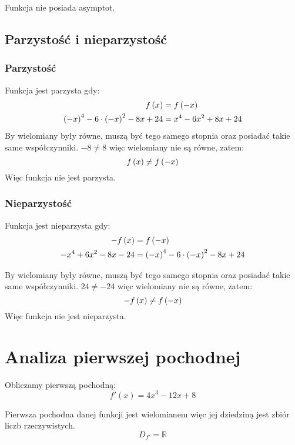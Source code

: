 \documentclass[a4paper,12pt]{article}
\newcommand{\fodx}{
		\ensuremath f \left( x \right)
	}
\newcommand{\naw}[1]{
		\ensuremath \left( #1 \right)
	}
\begin{document}
Funkcja nie posiada asymptot. 

\subsection{Parzystość i nieparzystość}
\subsubsection*{Parzystość}
Funkcja jest parzysta gdy:
\begin{align*}
	\fodx &= f \left( -x \right) \\
	\naw{-x}^4 - 6 \cdot \naw{-x}^2 - 8x +24 &= x^4 - 6x^2 + 8x +24
\end{align*}
By wielomiany były równe, muszą być tego samego stopnia oraz posiadać takie same współczynniki. $-8 \neq 8$ więc wielomiany nie są równe, zatem:
\[\fodx \neq f \left( -x \right)\]
Więc funkcja nie jest parzysta.

\subsubsection*{Nieparzystość}

Funkcja jest nieparzysta gdy:
\begin{align*}
	- \fodx &= f \naw{ -x } \\
	- x^4 + 6x^2 -8x -24 &= \naw{-x}^4 - 6 \cdot \naw{-x}^2 - 8x +24
\end{align*}

By wielomiany były równe, muszą być tego samego stopnia oraz posiadać takie same współczynniki. $24 \neq -24$ więc wielomiany nie są równe, zatem:
\[ - \fodx \neq f \naw{ -x } \]
Więc funkcja nie jest nieparzysta.
\section{Analiza pierwszej pochodnej}
Obliczamy pierwszą pochodną:
\[ f' \left( x \right) = 4x^3 - 12x + 8 \]

Pierwsza pochodna danej funkcji jest wielomianem więc jej dziedziną jest zbiór liczb rzeczywistych.
\[ D_{f'} = \mathbb{R} \]
\end{document}
